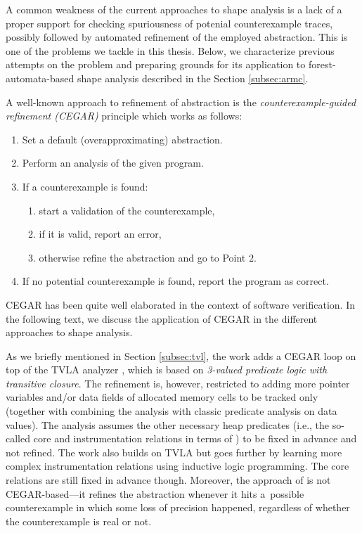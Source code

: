 	  A common weakness of the current approaches to shape analysis is a lack of a proper support for checking
	  spuriousness of potenial counterexample traces, possibly followed by automated refinement
	  of the employed abstraction. This is one of the problems we tackle in this thesis.
	  Below, we characterize previous attempts on the problem and preparing grounds for its application
          to forest-automata-based shape analysis described in the Section \ref{subsec:armc}.

	  A well-known approach to refinement of abstraction is the \emph{counterexample-guided
	  refinement (CEGAR)} principle \cite{CEGAR} which works as follows:
	  \begin{enumerate}
		\item Set a default (overapproximating) abstraction.
		\item Perform an analysis of the given program.
		\item If a counterexample is found:
		\begin{enumerate}
			\item start a validation of the counterexample,
			\item if it is valid, report an error,
			\item otherwise refine the abstraction and go to Point $2$.
		\end{enumerate}
		\item If no potential counterexample is found, report the program as correct.
	  \end{enumerate}
	  CEGAR has been quite well elaborated in the context of software verification.
	  In the following text, we discuss the application of CEGAR in the different
	  approaches to shape analysis.

	  As we briefly mentioned in Section \ref{subsec:tvl},
	  the work \cite{beyer:lazy_shape_analysis} adds a CEGAR loop on top of the TVLA
	  analyzer \cite{pale}, which is based on \emph{3-valued predicate logic with
	  transitive closure}. The refinement is, however, restricted to adding more
	  pointer variables and/or data fields of allocated memory cells to be tracked
	  only (together with combining the ana\-ly\-sis with classic predicate analysis on
	  data values). The analysis assumes the other necessary heap predicates (i.e.,
	  the so-called core and instrumentation relations in terms of \cite{pale}) to
	  be fixed in advance and not refined.
	  The work \cite{Loginov:AbstrRefViaInductLearning:05} also builds on TVLA but goes
	  further by learning more complex instrumentation relations using
	  inductive logic programming. The core relations are still fixed in
	  advance though. Moreover, the approach of
	  \cite{Loginov:AbstrRefViaInductLearning:05} is not CEGAR-based---it refines the
	  abstraction whenever it hits a~possible counterexample in which
	  some loss of precision happened, regardless of whether the counterexample is
	  real or not.

